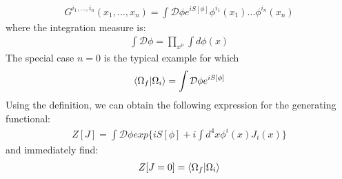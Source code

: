 \begin{align}
    G^{i_{1}, \dotso , i_{n}} (x_{1}, \dotso ,x_{n} ) = \int \mathcal{D} \phi e^{iS[\phi]} \phi^{i_1} (x_{1}) \dots \phi ^{i_{n}}(x_n)
\end{align}
where the integration measure is:
\begin{align}
    \int \mathcal{D} \phi = \prod_{x^{\mu}} \int d\phi(x)
\end{align}
The special case $n=0$ is the typical example for which
\begin{align}
    \braket{\Omega _{f}}{\Omega _{i}} = \int \mathcal{D} \phi e^{iS[\phi]}
\end{align}
Using the definition, we can obtain the following expression for the generating functional:
\begin{align}
    Z[J] = \int \mathcal{D} \phi exp\lbrace iS[\phi] + i \int d^{4}x \phi^{i} (x) J_{i} (x) \rbrace
\end{align}
and immediately find:
\begin{align}
    Z[J=0] = \braket{\Omega _{f}}{\Omega _{i}}
\end{align}

